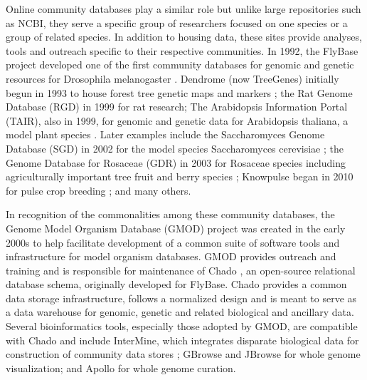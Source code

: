 Online community databases play a similar role but unlike large repositories such as NCBI, they serve a specific group of researchers focused on one species or a group of related species. In addition to housing data, these sites provide analyses, tools and outreach specific to their respective communities. In 1992, the FlyBase project developed one of the first community databases for genomic and genetic resources for Drosophila melanogaster \cite{The_FlyBase_Consortium_1994,Thurmond_2018}. Dendrome (now TreeGenes) initially begun in 1993 to house forest tree genetic maps and markers \cite{Falk_2018}; the Rat Genome Database (RGD) \cite{Shimoyama_2009,Shimoyama_2014} in 1999 for rat research; The Arabidopsis Information Portal (TAIR), also in 1999, for genomic and genetic data for Arabidopsis thaliana, a model plant species \cite{Berardini_2015}. Later examples include the Saccharomyces Genome Database (SGD) in 2002 for the model species Saccharomyces cerevisiae \cite{cherry2015saccharomyces}; the Genome Database for Rosaceae (GDR) in 2003 for Rosaceae species including agriculturally important tree fruit and berry species \cite{Jung_2018}; Knowpulse began in 2010 for pulse crop breeding \cite{sanderson2019knowpulse}; and many others.

In recognition of the commonalities among these community databases, the Genome Model Organism Database (GMOD) project was created in the early 2000s to help facilitate development of a common suite of software tools and infrastructure for model organism databases. GMOD provides outreach and training and is responsible for maintenance of Chado \cite{Mungall_2007}, an open-source relational database schema, originally developed for FlyBase. Chado provides a common data storage infrastructure, follows a normalized design and is meant to serve as a data warehouse for genomic, genetic and related biological and ancillary data. Several bioinformatics tools, especially those adopted by GMOD, are compatible with Chado and include InterMine, which integrates disparate biological data for construction of community data stores \cite{Smith_2012}; GBrowse \cite{Stein_2013} and JBrowse \cite{Buels_2016} for whole genome visualization; and Apollo \cite{Dunn_2019} for whole genome curation.

